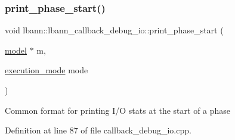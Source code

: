 \subsubsection{\texorpdfstring{print\+\_\+phase\+\_\+start()}{print\_phase\_start()}}
{\footnotesize\ttfamily void lbann\+::lbann\+\_\+callback\+\_\+debug\+\_\+io\+::print\+\_\+phase\+\_\+start (\begin{DoxyParamCaption}\item[{\hyperlink{classlbann_1_1model}{model} $\ast$}]{m,  }\item[{\hyperlink{base_8hpp_a2781a159088df64ed7d47cc91c4dc0a8}{execution\+\_\+mode}}]{mode }\end{DoxyParamCaption})}

Common format for printing I/O stats at the start of a phase 

Definition at line 87 of file callback\+\_\+debug\+\_\+io.\+cpp.


